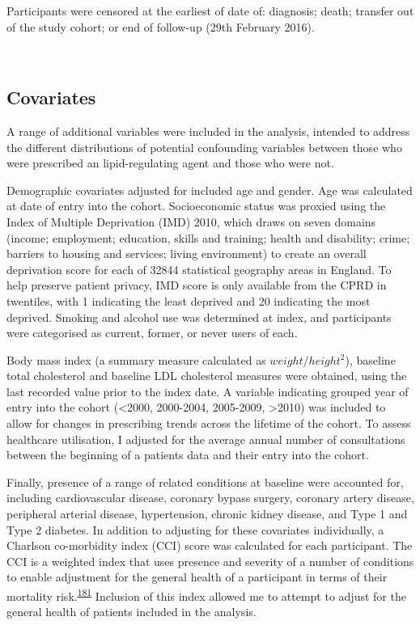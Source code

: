 \documentclass[a4paper, twoside]{templates/ociamthesis}
\begin{document}
Participants were censored at the earliest of date of: diagnosis; death; transfer out of the study cohort; or end of follow-up (29th February 2016).

~

\hypertarget{covariates}{%
\subsection{Covariates}\label{covariates}}

A range of additional variables were included in the analysis, intended to address the different distributions of potential confounding variables between those who were prescribed an lipid-regulating agent and those who were not.

Demographic covariates adjusted for included age and gender. Age was calculated at date of entry into the cohort. Socioeconomic status was proxied using the Index of Multiple Deprivation (IMD) 2010, which draws on seven domains (income; employment; education, skills and training; health and disability; crime; barriers to housing and services; living environment) to create an overall deprivation score for each of 32844 statistical geography areas in England. To help preserve patient privacy, IMD score is only available from the CPRD in twentiles, with 1 indicating the least deprived and 20 indicating the most deprived. Smoking and alcohol use was determined at index, and participants were categorised as current, former, or never users of each.

Body mass index (a summary measure calculated as \(weight/height^2\)), baseline total cholesterol and baseline LDL cholesterol measures were obtained, using the last recorded value prior to the index date. A variable indicating grouped year of entry into the cohort (\textless2000, 2000-2004, 2005-2009, \textgreater2010) was included to allow for changes in prescribing trends across the lifetime of the cohort. To assess healthcare utilisation, I adjusted for the average annual number of consultations between the beginning of a patients data and their entry into the cohort.

Finally, presence of a range of related conditions at baseline were accounted for, including cardiovascular disease, coronary bypass surgery, coronary artery disease, peripheral arterial disease, hypertension, chronic kidney disease, and Type 1 and Type 2 diabetes. In addition to adjusting for these covariates individually, a Charlson co-morbidity index (CCI) score was calculated for each participant. The CCI is a weighted index that uses presence and severity of a number of conditions to enable adjustment for the general health of a participant in terms of their mortality risk.\textsuperscript{\protect\hyperlink{ref-charlson1987new}{181}} Inclusion of this index allowed me to attempt to adjust for the general health of patients included in the analysis.
\end{document}
